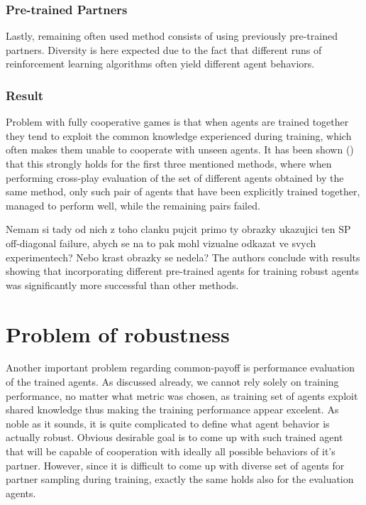 \subsubsection*{Pre-trained Partners}
Lastly, remaining often used method consists of using previously pre-trained partners.
Diversity is here expected due to the fact that different runs of reinforcement learning algorithms often yield different agent behaviors.


\subsubsection*{Result}\label{offDiagonalReport}
Problem with fully cooperative games is that when agents are trained together they tend to exploit the common knowledge experienced during training, which often makes them unable to cooperate with unseen agents.
It has been shown (\cite{10.1007/978-3-030-63823-8_46}) that this strongly holds for the first three mentioned methods, 
where when performing cross-play evaluation of the set of different agents obtained by the same method, 
only such pair of agents that have been explicitly trained together, managed to perform well, while the remaining pairs failed.

{\color{blue} Nemam si tady od nich z toho clanku pujcit primo ty obrazky ukazujici ten SP off-diagonal failure, abych se na to pak mohl vizualne odkazat ve svych experimentech? 
Nebo krast obrazky se nedela?}
The authors conclude with results showing that incorporating different pre-trained agents for training robust agents was significantly more successful than other methods.


\section{Problem of robustness}
Another important problem regarding common-payoff is performance evaluation of the trained agents.
As discussed already, we cannot rely solely on training performance, no matter what metric was chosen, as training set of agents exploit shared knowledge thus making the training performance appear excelent.
As noble as it sounds, it is quite complicated to define what agent behavior is actually robust.
Obvious desirable goal is to come up with such trained agent that will be capable of cooperation with ideally all possible behaviors of it's partner.
However, since it is difficult to come up with diverse set of agents for partner sampling during training, exactly the same holds also for the evaluation agents.

